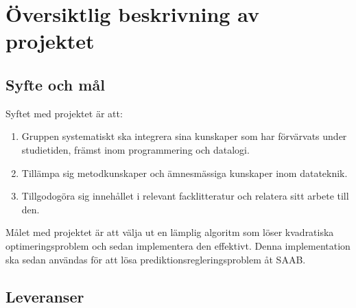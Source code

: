 \section{Översiktlig beskrivning av projektet}


\subsection{Syfte och mål}
Syftet med projektet är att:
\begin{enumerate}
 \item Gruppen systematiskt ska integrera sina kunskaper som har förvärvats under studietiden, främst inom programmering och datalogi. 
 \item Tillämpa sig  metodkunskaper och ämnesmässiga kunskaper inom datateknik.
 \item Tillgodogöra sig innehållet i relevant facklitteratur och relatera sitt arbete till den.
\end{enumerate}

Målet med projektet är att välja ut en lämplig algoritm som löser kvadratiska optimeringsproblem och sedan implementera den effektivt. Denna implementation ska sedan användas för att lösa prediktionsregleringsproblem åt SAAB. 

\subsection{Leveranser}

